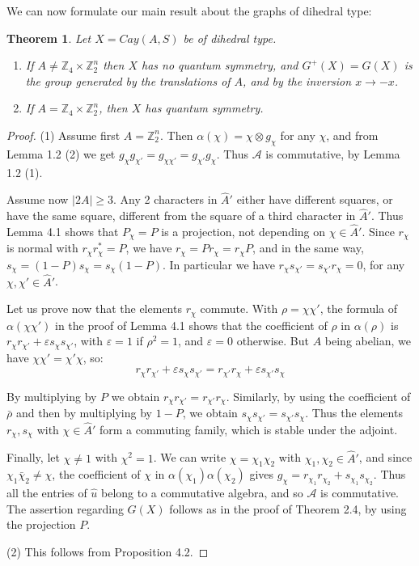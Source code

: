 \documentclass[11pt]{amsart}
\newtheorem{theorem}{Theorem}[section]
\newcommand{\A}{\mathcal A}
\newcommand{\Z}{\mathbb Z}
\newcommand{\hA}{\widehat A}
\newcommand{\hu}{\widehat u}
\newcommand{\bchi}{\bar\chi}
\begin{document}
We can now formulate our main result about the graphs of dihedral type:

\begin{theorem}
Let $X=Cay(A,S)$ be of dihedral type.
\begin{enumerate}
\item If $A\neq\Z_4\times\Z_2^n$ then $X$ has no quantum symmetry, and $G^+(X)=G(X)$ is the group generated by the translations of $A$, and by the inversion $x\to-x$.
\item If $A=\Z_4\times\Z_2^n$, then $X$ has quantum symmetry.
\end{enumerate}
\end{theorem}

\begin{proof}
(1) Assume first $A=\Z_2^n$. Then $\alpha(\chi)=\chi\otimes g_\chi$ for any $\chi$, and from Lemma 1.2 (2) we get $g_\chi g_{\chi'}=g_{\chi\chi'}=g_{\chi'}g_\chi$. Thus $\A$ is commutative, by Lemma 1.2 (1).

Assume now $|2A|\geq3$. Any 2 characters in $\hA'$ either have different squares, or have the same square, different from the square of a third character in $\hA'$. Thus Lemma 4.1 shows that $P_\chi=P$ is a projection, not depending on $\chi\in\hA'$. Since $r_\chi$ is normal with $r_\chi r_\chi^*=P$, we have $r_\chi=Pr_\chi=r_\chi P$, and in the same way, $s_\chi=(1-P)s_\chi=s_\chi(1-P)$. In particular we have $r_\chi s_{\chi'}=s_{\chi'}r_\chi=0$, for any $\chi,\chi'\in\hA'$.

Let us prove now that the elements $r_\chi$ commute. With $\rho=\chi\chi'$, the formula of $\alpha(\chi\chi')$ in the proof of Lemma 4.1 shows that the coefficient of $\rho$ in $\alpha(\rho)$ is $r_\chi r_{\chi'}+\varepsilon s_\chi s_{\chi'}$, with $\varepsilon=1$ if $\rho^2=1$, and $\varepsilon=0$ otherwise. But $A$ being abelian, we have $\chi\chi'=\chi'\chi$, so:
$$r_\chi r_{\chi'}+\varepsilon s_\chi s_{\chi'}=r_{\chi'}r_\chi+\varepsilon s_{\chi'}s_\chi$$

By multiplying by $P$ we obtain $r_\chi r_{\chi'}=r_{\chi'}r_\chi$. Similarly, by using the coefficient of $\bar\rho$ and then by multiplying by $1-P$, we obtain $s_\chi s_{\chi'}=s_{\chi'}s_\chi$. Thus the elements $r_\chi,s_\chi$ with $\chi\in\hA'$ form a commuting family, which is stable under the adjoint.

Finally, let $\chi\neq1$ with $\chi^2=1$. We can write $\chi=\chi_1\chi_2$ with $\chi_1,\chi_2\in\hA'$, and since $\chi_1\bchi_2\neq\chi$, the coefficient of $\chi$ in $\alpha(\chi_1)\alpha(\chi_2)$ gives $g_\chi=r_{\chi_1}r_{\chi_2}+s_{\chi_1}s_{\chi_2}$. Thus all the entries of $\hu$ belong to a commutative algebra, and so $\A$ is commutative. The assertion regarding $G(X)$ follows as in the proof of Theorem 2.4, by using the projection $P$.

(2) This follows from Proposition 4.2.
\end{proof}
\end{document}
